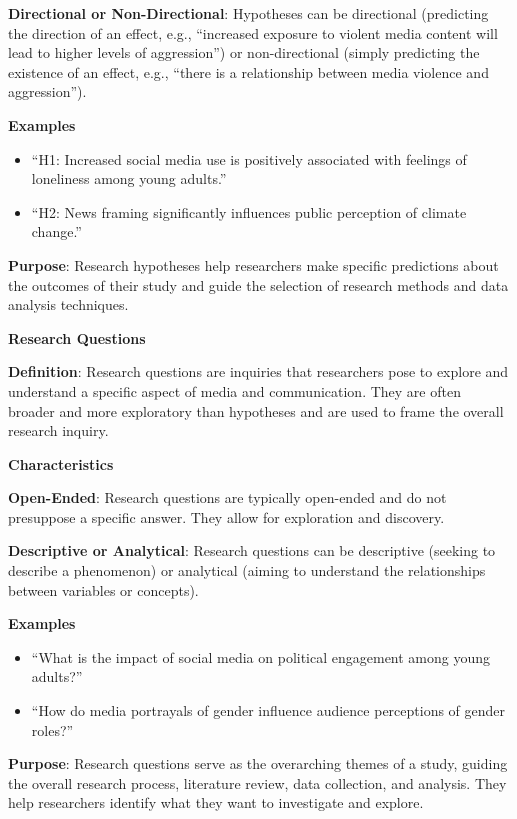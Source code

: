 \documentclass[
  b5paper]{book}
\begin{document}
\textbf{Directional or Non-Directional}: Hypotheses can be directional (predicting the direction of an effect, e.g., ``increased exposure to violent media content will lead to higher levels of aggression'') or non-directional (simply predicting the existence of an effect, e.g., ``there is a relationship between media violence and aggression'').

\textbf{Examples}

\begin{itemize}
\item
  ``H1: Increased social media use is positively associated with feelings of loneliness among young adults.''
\item
  ``H2: News framing significantly influences public perception of climate change.''
\end{itemize}

\textbf{Purpose}: Research hypotheses help researchers make specific predictions about the outcomes of their study and guide the selection of research methods and data analysis techniques.

\textbf{Research Questions}

\textbf{Definition}: Research questions are inquiries that researchers pose to explore and understand a specific aspect of media and communication. They are often broader and more exploratory than hypotheses and are used to frame the overall research inquiry.

\textbf{Characteristics}

\textbf{Open-Ended}: Research questions are typically open-ended and do not presuppose a specific answer. They allow for exploration and discovery.

\textbf{Descriptive or Analytical}: Research questions can be descriptive (seeking to describe a phenomenon) or analytical (aiming to understand the relationships between variables or concepts).

\textbf{Examples}

\begin{itemize}
\item
  ``What is the impact of social media on political engagement among young adults?''
\item
  ``How do media portrayals of gender influence audience perceptions of gender roles?''
\end{itemize}

\textbf{Purpose}: Research questions serve as the overarching themes of a study, guiding the overall research process, literature review, data collection, and analysis. They help researchers identify what they want to investigate and explore.
\end{document}

